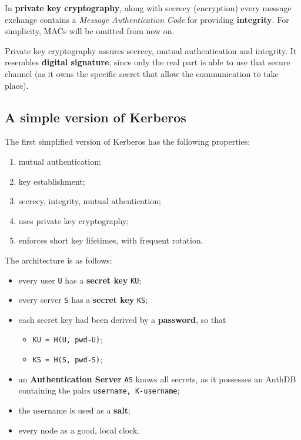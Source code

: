 \documentclass[10pt]{extbook}
\begin{document}
In \textbf{private key cryptography}, along with secrecy (encryption) every
message exchange contains a \emph{Message Authentication Code} for providing
\textbf{integrity}. For simplicity, MACs will be omitted from now on.

Private key cryptography assures secrecy, mutual authentication and integrity.
It resembles \textbf{digital signature}, since only the real part is able to
use that secure channel (as it owns the specific secret that allow the
communication to take place).

\subsection{A simple version of Kerberos}

The first simplified version of Kerberos has the following properties:
\begin{enumerate}
    \item mutual authentication;
    \item key establishment;
    \item secrecy, integrity, mutual athentication;
    \item uses private key cryptography;
    \item enforces short key lifetimes, with frequent rotation.
\end{enumerate}

The architecture is as follows:
\begin{itemize}
    \item every user \texttt{U} has a \textbf{secret key} \texttt{KU};
    \item every server \texttt{S} has a \textbf{secret key} \texttt{KS};
    \item each secret key had been derived by a \textbf{password}, so that
    \begin{itemize}
        \item \texttt{KU = H(U, pwd-U)};
        \item \texttt{KS = H(S, pwd-S)};
    \end{itemize}
    \item an \textbf{Authentication Server} \texttt{AS} knows all secrets, as it
        possesses an AuthDB containing the pairs \texttt{username, K-username};
    \item the username is used as a \textbf{salt};
    \item every node as a good, local clock.
\end{itemize}
\end{document}
